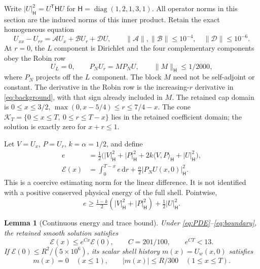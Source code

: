 \documentclass[11pt]{article}
\newcommand{\dd}{\mathrm d}
\newcommand{\norm}[1]{\lVert #1\rVert}
\newcommand{\HH}{\mathsf H}
\newcommand{\ip}[2]{\langle #1,#2\rangle_{\HH}}
\newcommand{\PN}{P_N}
\newtheorem{lemma}{Lemma}
\begin{document}
Write $|U|_{\HH}^2=U^\mathsf{T}\HH U$ for
$\HH=\operatorname{diag}(1,2,1,3,1)$. All operator norms in this section
are the induced norms of this inner product. Retain the exact homogeneous
equation
\begin{equation}
 U_{xx}-U_{rr}=\mathcal A U_x+\mathcal B U_r+\mathcal D U,\qquad
 \norm{\mathcal A},\norm{\mathcal B}\le10^{-4},\quad
 \norm{\mathcal D}\le10^{-6}.
 \label{eq:PDE}
\end{equation}
At $r=0$, the $L$ component is Dirichlet and the four complementary
components obey the Robin row
\begin{equation}
 U_L=0,\qquad \PN U_r=M\PN U,\qquad \norm{M}_{\HH}\le1/2000,
 \label{eq:boundary}
\end{equation}
where $\PN$ projects off the $L$ component. The block $M$ need not be
self-adjoint or constant. The derivative in the Robin row is the
increasing-$r$ derivative in \eqref{eq:background}, with that sign already
included in $M$. The retained cap domain is
$0\le x\le3/2$, $\max(0,x-5/4)\le r\le7/4-x$.
The cone
$\mathcal K_T=\{0\le x\le T,\ 0\le r\le T-x\}$ lies in the retained
coefficient domain; the solution is exactly zero for $x+r\le1$.

Let $V=U_x$, $P=U_r$, $k=\alpha=1/2$, and define
\begin{align}
 e&=\tfrac12\bigl(|V|_{\HH}^2+|P|_{\HH}^2+
                     2k\ip{V}{P}+|U|_{\HH}^2\bigr),\nonumber\\
 \mathcal E(x)&=\int_0^{T-x}e\,\dd r+
                         \tfrac{\alpha}{2}|\PN U(x,0)|_{\HH}^2.
 \label{eq:energy}
\end{align}
This is a coercive estimating norm for the linear difference. It is not
identified with a positive conserved physical energy of the full shell.
Pointwise,
\begin{equation}
 e\ge\tfrac{1-k}{2}(|V|_{\HH}^2+|P|_{\HH}^2)+\tfrac12|U|_{\HH}^2.
 \label{eq:coercive}
\end{equation}

\begin{lemma}[Continuous energy and trace bound]\label{lem:energy}
Under \eqref{eq:PDE}--\eqref{eq:boundary}, the retained smooth solution
satisfies
\begin{equation}
 \mathcal E(x)\le e^{Cx}\mathcal E(0),\qquad
 C=201/100,\qquad e^{CT}<13.
 \label{eq:growth}
\end{equation}
If $\mathcal E(0)\le R^2/(5\times10^6)$, its scalar shell history
$m(x)=U_w(x,0)$ satisfies
\begin{equation}
 m(x)=0\quad(x\le1),\qquad |m(x)|\le R/300\quad(1\le x\le T).
 \label{eq:trace}
\end{equation}
\end{lemma}
\end{document}
